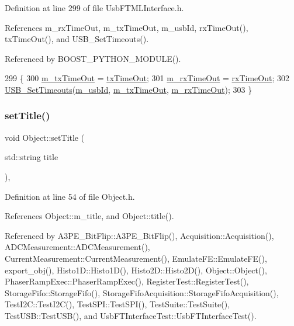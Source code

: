 Definition at line 299 of file Usb\+F\+T\+M\+L\+Interface.\+h.



References m\+\_\+rx\+Time\+Out, m\+\_\+tx\+Time\+Out, m\+\_\+usb\+Id, rx\+Time\+Out(), tx\+Time\+Out(), and U\+S\+B\+\_\+\+Set\+Timeouts().



Referenced by B\+O\+O\+S\+T\+\_\+\+P\+Y\+T\+H\+O\+N\+\_\+\+M\+O\+D\+U\+L\+E().


\begin{DoxyCode}
299                                                 \{
300     \hyperlink{classUsbFTMLInterface_a48cd0df4e1d8fd53d96b208b5b9c7061}{m\_txTimeOut} = \hyperlink{classUsbFTMLInterface_ad7e76fd952273faf094bf3475b2963da}{txTimeOut};
301     \hyperlink{classUsbFTMLInterface_a4e3a413912cb5f61b5885c0d22e6c179}{m\_rxTimeOut} = \hyperlink{classUsbFTMLInterface_a106df14066462a38f7e4849c9d15828a}{rxTimeOut};
302     \hyperlink{LALUsbML_8h_a217702d9c80d1bb65ce8703c0a7382fa}{USB\_SetTimeouts}(\hyperlink{classUsbFTMLInterface_aab6754587c303660d5c498ce34a2b4c8}{m\_usbId}, \hyperlink{classUsbFTMLInterface_a48cd0df4e1d8fd53d96b208b5b9c7061}{m\_txTimeOut}, 
      \hyperlink{classUsbFTMLInterface_a4e3a413912cb5f61b5885c0d22e6c179}{m\_rxTimeOut});
303   \}
\end{DoxyCode}
\mbox{\label{classObject_a89557dbbad5bcaa02652f5d7fa35d20f}} 
\subsubsection{\texorpdfstring{set\+Title()}{setTitle()}}
{\footnotesize\ttfamily void Object\+::set\+Title (\begin{DoxyParamCaption}\item[{std\+::string}]{title }\end{DoxyParamCaption})\hspace{0.3cm}{\ttfamily [inline]}, {\ttfamily [inherited]}}



Definition at line 54 of file Object.\+h.



References Object\+::m\+\_\+title, and Object\+::title().



Referenced by A3\+P\+E\+\_\+\+Bit\+Flip\+::\+A3\+P\+E\+\_\+\+Bit\+Flip(), Acquisition\+::\+Acquisition(), A\+D\+C\+Measurement\+::\+A\+D\+C\+Measurement(), Current\+Measurement\+::\+Current\+Measurement(), Emulate\+F\+E\+::\+Emulate\+F\+E(), export\+\_\+obj(), Histo1\+D\+::\+Histo1\+D(), Histo2\+D\+::\+Histo2\+D(), Object\+::\+Object(), Phaser\+Ramp\+Exec\+::\+Phaser\+Ramp\+Exec(), Register\+Test\+::\+Register\+Test(), Storage\+Fifo\+::\+Storage\+Fifo(), Storage\+Fifo\+Acquisition\+::\+Storage\+Fifo\+Acquisition(), Test\+I2\+C\+::\+Test\+I2\+C(), Test\+S\+P\+I\+::\+Test\+S\+P\+I(), Test\+Suite\+::\+Test\+Suite(), Test\+U\+S\+B\+::\+Test\+U\+S\+B(), and Usb\+F\+T\+Interface\+Test\+::\+Usb\+F\+T\+Interface\+Test().


